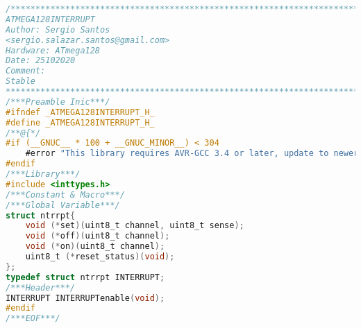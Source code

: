 \begin{lstlisting}[language=C]
/************************************************************************
ATMEGA128INTERRUPT
Author: Sergio Santos 
<sergio.salazar.santos@gmail.com>
Hardware: ATmega128
Date: 25102020
Comment:
Stable
************************************************************************/
/***Preamble Inic***/
#ifndef _ATMEGA128INTERRUPT_H_
#define _ATMEGA128INTERRUPT_H_
/**@{*/
#if (__GNUC__ * 100 + __GNUC_MINOR__) < 304
	#error "This library requires AVR-GCC 3.4 or later, update to newer AVR-GCC compiler !"
#endif
/***Library***/
#include <inttypes.h>
/***Constant & Macro***/
/***Global Variable***/
struct ntrrpt{
	void (*set)(uint8_t channel, uint8_t sense);
	void (*off)(uint8_t channel);
	void (*on)(uint8_t channel);
	uint8_t (*reset_status)(void);
};
typedef struct ntrrpt INTERRUPT;
/***Header***/
INTERRUPT INTERRUPTenable(void);
#endif
/***EOF***/
\end{lstlisting}
